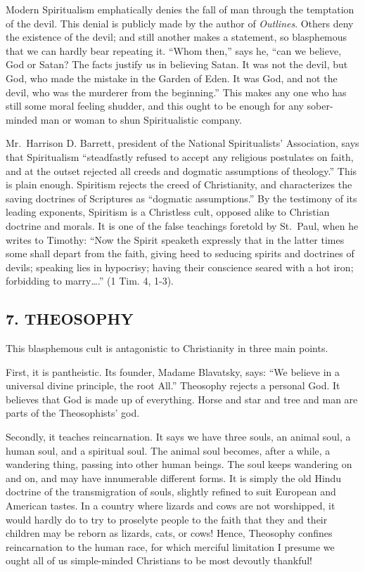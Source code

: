 \documentclass[
]{book}
\begin{document}
Modern Spiritualism emphatically denies the fall of man through the temptation of the devil. This denial is publicly made by the author of \emph{Outlines}. Others deny the existence of the devil; and still another makes a statement, so blasphemous that we can hardly bear repeating it. ``Whom then,'' says he, ``can we believe, God or Satan? The facts justify us in believing Satan. It was not the devil, but God, who made the mistake in the Garden of Eden. It was God, and not the devil, who was the murderer from the beginning.'' This makes any one who has still some moral feeling shudder, and this ought to be enough for any sober-minded man or woman to shun Spiritualistic company.

Mr.~Harrison D. Barrett, president of the National Spiritualists' Association, says that Spiritualism ``steadfastly refused to accept any religious postulates on faith, and at the outset rejected all creeds and dogmatic assumptions of theology.'' This is plain enough. Spiritism rejects the creed of Christianity, and characterizes the saving doctrines of Scriptures as ``dogmatic assumptions.'' By the testimony of its leading exponents, Spiritism is a Christless cult, opposed alike to Christian doctrine and morals. It is one of the false teachings foretold by St.~Paul, when he writes to Timothy: ``Now the Spirit speaketh expressly that in the latter times some shall depart from the faith, giving heed to seducing spirits and doctrines of devils; speaking lies in hypocrisy; having their conscience seared with a hot iron; forbidding to marry\ldots.'' (1 Tim. 4, 1-3).

\hypertarget{theosophy}{%
\subsection*{\texorpdfstring{7. THEOSOPHY}{7. THEOSOPHY}}\label{theosophy}}

This blasphemous cult is antagonistic to Christianity in three main points.

First, it is pantheistic. Its founder, Madame Blavatsky, says: ``We believe in a universal divine principle, the root All.'' Theosophy rejects a personal God. It believes that God is made up of everything. Horse and star and tree and man are parts of the Theosophists' god.

Secondly, it teaches reincarnation. It says we have three souls, an animal soul, a human soul, and a spiritual soul. The animal soul becomes, after a while, a wandering thing, passing into other human beings. The soul keeps wandering on and on, and may have innumerable different forms. It is simply the old Hindu doctrine of the transmigration of souls, slightly refined to suit European and American tastes. In a country where lizards and cows are not worshipped, it would hardly do to try to proselyte people to the faith that they and their children may be reborn as lizards, cats, or cows! Hence, Theosophy confines reincarnation to the human race, for which merciful limitation I presume we ought all of us simple-minded Christians to be most devoutly thankful!
\end{document}
